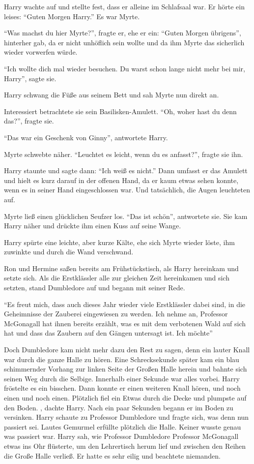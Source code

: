 Harry wachte auf und stellte fest, dass er alleine im Schlafsaal war. Er hörte ein leises: \enquote{Guten Morgen Harry.} Es war Myrte.

\enquote{Was machst du hier Myrte?}, fragte er, ehe er ein: \enquote{Guten Morgen übrigens}, hinterher gab, da er nicht unhöflich sein wollte und da ihm Myrte das sicherlich wieder vorwerfen würde.

\enquote{Ich wollte dich mal wieder besuchen. Du warst schon lange nicht mehr bei mir, Harry}, sagte sie.

Harry schwang die Füße aus seinem Bett und sah Myrte nun direkt an.

Interessiert betrachtete sie sein Basilisken-Amulett. \enquote{Oh, woher hast du denn das?}, fragte sie.

\enquote{Das war ein Geschenk von Ginny}, antwortete Harry.

Myrte schwebte näher. \enquote{Leuchtet es leicht, wenn du es anfasst?}, fragte sie ihn.

Harry staunte und sagte dann: \enquote{Ich weiß es nicht.} Dann umfasst er das Amulett und hielt es kurz darauf in der offenen Hand, da er kaum etwas sehen konnte, wenn es in seiner Hand eingeschlossen war. Und tatsächlich, die Augen leuchteten auf.

Myrte ließ einen glücklichen Seufzer los. \enquote{Das ist schön}, antwortete sie. Sie kam Harry näher und drückte ihm einen Kuss auf seine Wange.

Harry spürte eine leichte, aber kurze Kälte, ehe sich Myrte wieder löste, ihm zuwinkte und durch die Wand verschwand.

Ron und Hermine saßen bereits am Frühstückstisch, als Harry hereinkam und setzte sich. Als die Erstklässler alle zur gleichen Zeit hereinkamen und sich setzten, stand Dumbledore auf und begann mit seiner Rede.

\enquote{Es freut mich, dass auch dieses Jahr wieder viele Erstklässler dabei sind, in die Geheimnisse der Zauberei eingewiesen zu werden. Ich nehme an, Professor McGonagall hat ihnen bereits erzählt, was es mit dem verbotenen Wald auf sich hat und dass das Zaubern auf den Gängen untersagt ist. Ich möchte\abs}

Doch Dumbledore kam nicht mehr dazu den Rest zu sagen, denn ein lauter Knall war durch die ganze Halle zu hören. Eine Schrecksekunde später kam ein blau schimmernder Vorhang zur linken Seite der Großen Halle herein und bahnte sich seinen Weg durch die Selbige. Innerhalb einer Sekunde war alles vorbei. Harry fröstelte es ein bisschen. Dann konnte er einen weiteren Knall hören, und noch einen und noch einen. Plötzlich fiel ein Etwas durch die Decke und plumpste auf den Boden. , dachte Harry. Nach ein paar Sekunden begann er im Boden zu versinken. Harry schaute zu Professor Dumbledore und fragte sich, was denn nun passiert sei. Lautes Gemurmel erfüllte plötzlich die Halle. Keiner wusste genau was passiert war. Harry sah, wie Professor Dumbledore Professor McGonagall etwas ins Ohr flüsterte, um den Lehrertisch herum lief und zwischen den Reihen die Große Halle verließ. Er hatte es sehr eilig und beachtete niemanden.

